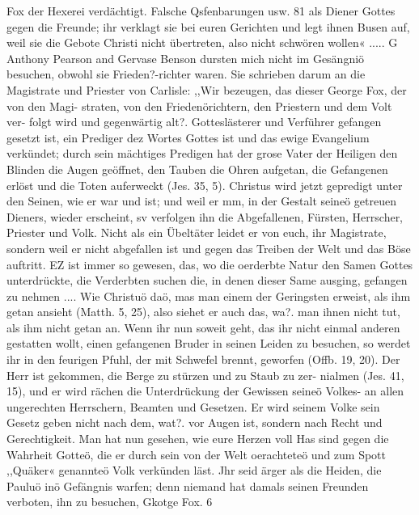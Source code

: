 Fox der Hexerei verdächtigt. Falsche Qsfenbarungen usw. 81
als Diener Gottes gegen die Freunde; ihr verklagt sie bei euren
Gerichten und legt ihnen Busen auf, weil sie die Gebote Christi
nicht übertreten, also nicht schwören wollen« ..... G
Anthony Pearson and Gervase Benson dursten mich nicht im
Gesängniö besuchen, obwohl sie Frieden?-richter waren. Sie
schrieben darum an die Magistrate und Priester von Carlisle:
,,Wir bezeugen, das dieser George Fox, der von den Magi-
straten, von den Friedenörichtern, den Priestern und dem Volt ver-
folgt wird und gegenwärtig alt?. Gotteslästerer und Verführer
gefangen gesetzt ist, ein Prediger dez Wortes Gottes ist und das
ewige Evangelium verkündet; durch sein mächtiges Predigen hat
der grose Vater der Heiligen den Blinden die Augen geöffnet,
den Tauben die Ohren aufgetan, die Gefangenen erlöst und die
Toten auferweckt (Jes. 35, 5). Christus wird jetzt gepredigt unter
den Seinen, wie er war und ist; und weil er mm, in der Gestalt
seineö getreuen Dieners, wieder erscheint, sv verfolgen ihn die
Abgefallenen, Fürsten, Herrscher, Priester und Volk. Nicht als
ein Übeltäter leidet er von euch, ihr Magistrate, sondern weil er
nicht abgefallen ist und gegen das Treiben der Welt und das
Böse auftritt. EZ ist immer so gewesen, das, wo die oerderbte
Natur den Samen Gottes unterdrückte, die Verderbten suchen die,
in denen dieser Same ausging, gefangen zu nehmen .... Wie
Christuö daö, mas man einem der Geringsten erweist, als ihm
getan ansieht (Matth. 5, 25), also siehet er auch das, wa?. man
ihnen nicht tut, als ihm nicht getan an. Wenn ihr nun soweit
geht, das ihr nicht einmal anderen gestatten wollt, einen gefangenen
Bruder in seinen Leiden zu besuchen, so werdet ihr in den feurigen
Pfuhl, der mit Schwefel brennt, geworfen (Offb. 19, 20). Der
Herr ist gekommen, die Berge zu stürzen und zu Staub zu zer-
nialmen (Jes. 41, 15), und er wird rächen die Unterdrückung der
Gewissen seineö Volkes- an allen ungerechten Herrschern, Beamten
und Gesetzen. Er wird seinem Volke sein Gesetz geben nicht nach
dem, wat?. vor Augen ist, sondern nach Recht und Gerechtigkeit.
Man hat nun gesehen, wie eure Herzen voll Has sind gegen die
Wahrheit Gotteö, die er durch sein von der Welt oerachteteö und
zum Spott ,,Quäker« genannteö Volk verkünden läst. Jhr seid
ärger als die Heiden, die Pauluö inö Gefängnis warfen; denn
niemand hat damals seinen Freunden verboten, ihn zu besuchen,
Gkotge Fox. 6



